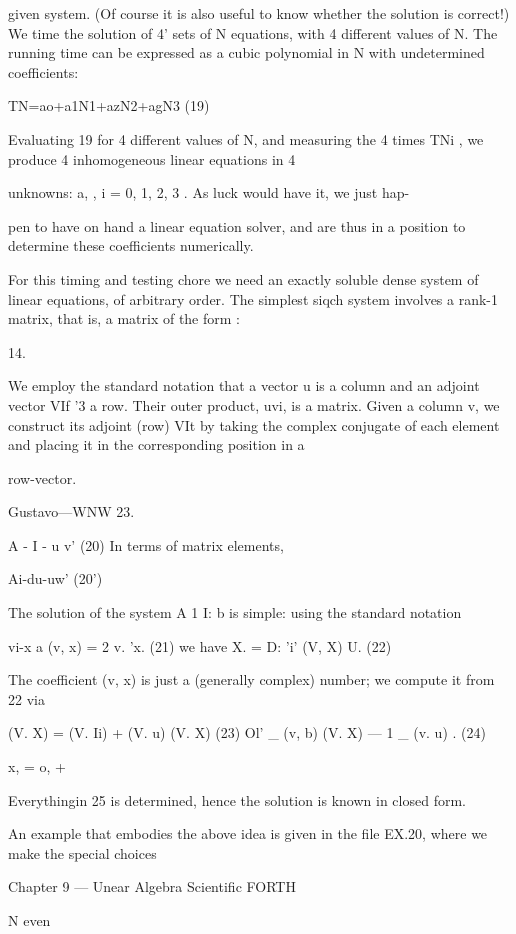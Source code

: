{{{{{{{{given system. (Of course it is also useful to know whether the
solution is correct!) We time the solution of 4' sets of N equations,
with 4 different values of N. The running time can be expressed
as a cubic polynomial in N with undetermined coefficients:

TN=ao+a1N1+azN2+agN3 (19)

Evaluating 19 for 4 different values of N, and measuring the 4
times TNi , we produce 4 inhomogeneous linear equations in 4

unknowns: a, , i = 0, 1, 2, 3 . As luck would have it, we just hap-

pen to have on hand a linear equation solver, and are thus in a
position to determine these coefficients numerically.

For this timing and testing chore we need an exactly soluble dense
system of linear equations, of arbitrary order. The simplest siqch
system involves a rank-1 matrix, that is, a matrix of the form :

 

14.

We employ the standard notation that a vector u is a column and an adjoint vector VIf '3 a row.
Their outer product, uvi, is a matrix. Given a column v, we construct its adjoint (row) VIt by
taking the complex conjugate of each element and placing it in the corresponding position in a

row-vector.

Gustavo—WNW 23.

A - I - u v' (20)
In terms of matrix elements,

Ai-du-uw' (20')

The solution of the system A 1 I: b is simple: using the standard
notation

vi-x a (v, x) = 2 v. 'x. (21)
we have
X. = D: 'i' (V, X) U. (22)

The coefficient (v, x) is just a (generally complex) number; we
compute it from 22 via

(V. X) = (V. Ii) + (V. u) (V. X) (23)
Ol'
\_ (v, b)
(V. X) — 1 \_ (v. u) . (24)

x, = o, + %

Everythingin 25 is determined, hence the solution is known in
closed form.

An example that embodies the above idea is given in the file
EX.20, where we make the special choices

Chapter 9 — Unear Algebra Scientific FORTH

N even

}}}}}}}}

